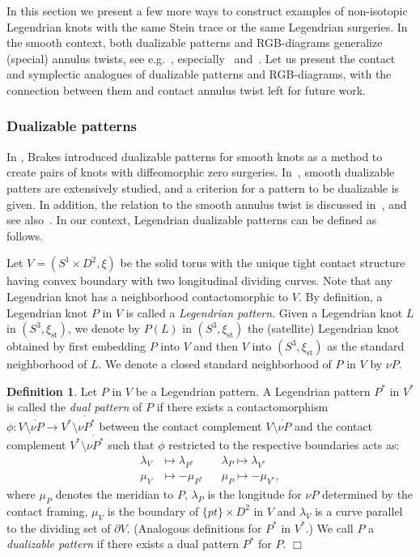 \documentclass[11pt]{amsart} %
\newcommand{\xist}{\xi_{\mathrm{st}}}
\theoremstyle{plain}
\theoremstyle{definition}
\newtheorem{defi}[Theorem]{Definition}
\begin{document}
In this section we present a few more ways to construct examples of non-isotopic Legendrian knots with the same Stein trace or the same Legendrian surgeries. In the smooth context, both dualizable patterns and RGB-diagrams generalize (special) annulus twists, see e.g.~\cite{MillerPiccirillo18,Tagami2,Tagami1}, especially~\cite[Section 6]{MillerPiccirillo18} and~\cite[Theorem 4.8]{Tagami1}. Let us present the contact and symplectic analogues of dualizable patterns and RGB-diagrams, with the connection between them and contact annulus twist left for future work.

\subsubsection{Dualizable patterns}
In \cite{Brakes80}, Brakes introduced dualizable patterns for smooth knots as a method to create pairs of knots with diffeomorphic zero surgeries. In~\cite{MillerPiccirillo18}, smooth dualizable patters are extensively studied, and a criterion for a pattern to be dualizable is given. In addition, the relation to the smooth annulus twist is discussed in~\cite{MillerPiccirillo18}, and see also~\cite[Section 3.2]{Tagami2}. In our context, Legendrian dualizable patterns can be defined as follows.

Let $V=(S^1\times D^2, \xi)$ be the solid torus with the unique tight contact structure having convex boundary with two longitudinal dividing curves. Note that any Legendrian knot has a neighborhood contactomorphic to $V$. By definition, a Legendrian knot $P$ in $V$ is called a {\it Legendrian pattern}. Given a Legendrian knot $L$ in $(S^3,\xist)$, we denote by $P(L)$ in $(S^3,\xist)$ the (satellite) Legendrian knot obtained by first embedding $P$ into $V$ and then $V$ into $(S^3,\xist)$ as the standard neighborhood of $L$. We denote a closed standard neighborhood of $P$ in $V$ by $\nu P$. 

\begin{defi}\label{def:LegDualizablePatterns}
Let $P$ in $V$ be a Legendrian pattern. A Legendrian pattern $P^*$ in $V^*$ is called the {\it dual pattern} of $P$ if there exists a contactomorphism $\phi:V\setminus\mathring{\nu P}\longrightarrow V^*\setminus\mathring{\nu P^*}$ between the contact complement $V\setminus\mathring{\nu P}$ and the contact complement $V^*\setminus\mathring{\nu P^*}$ such that $\phi$ restricted to the respective boundaries acts as:
\begin{align*}
\lambda_V&\longmapsto\lambda_{P^*} & & \lambda_P\longmapsto \lambda_{V^*}\\
\mu_V&\longmapsto -\mu_{P^*}& &\mu_P\longmapsto -\mu_{V^*},
\end{align*}
where $\mu_P$ denotes the meridian to $P$, $\lambda_P$ is the longitude for $\nu P$ determined by the contact framing, $\mu_V$ is the boundary of $\{pt\}\times D^2$ in $V$ and $\lambda_V$ is a curve parallel to the dividing set of $\partial V$. (Analogous definitions for $P^*$ in $V^*$.) We call $P$ a \textit{dualizable pattern} if there exists a dual pattern $P^*$ for $P$. \hfill$\Box$ 
\end{defi}
\end{document}
